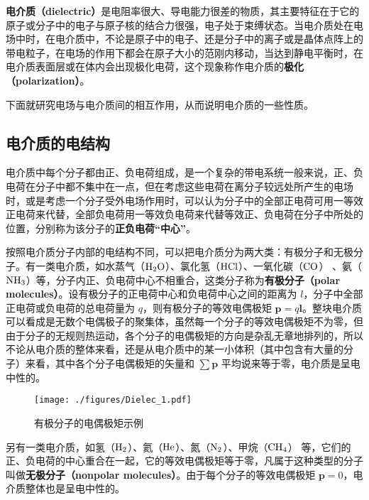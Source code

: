 
\begin{issues}
\end{issues}


\textbf{电介质（dielectric）}是电阻率很大、导电能力很差的物质，其主要特征在于它的原子或分子中的电子与原子核的结合力很强，电子处于束缚状态。当电介质处在电场中时，在电介质中，不论是原子中的电子、还是分子中的离子或是晶体点阵上的带电粒子，在电场的作用下都会在原子大小的范刚内移动，当达到静电平衡时，在电介质表面层或在体内会出现极化电荷，这个现象称作电介质的\textbf{极化（polarization）}。

下面就研究电场与电介质间的相互作用，从而说明电介质的一些性质。

\subsection{电介质的电结构}

电介质中每个分子都由正、负电荷组成，是一个复杂的带电系统一般来说，正、负电荷在分子中都不集中在一点，但在考虑这些电荷在离分子较远处所产生的电场时，或是考虑一个分子受外电场作用时，可以认为分子中的全部正电荷可用一等效正电荷来代替，全部负电荷用一等效负电荷来代替等效正、负电荷在分子中所处的位置，分别称为该分子的\textbf{正负电荷“中心”}。

按照电介质分子内部的电结构不同，可以把电介质分为两大类：有极分子和无极分子。有一类电介质，如水蒸气（$\rm H_2O$）、氯化氢（$\rm HCl$）、一氧化碳（$\rm CO$） 、氨（$\rm NH_3$）等，分子内正、负电荷中心不相重合，这类分子称为\textbf{有极分子（polar molecules）}。设有极分子的正电荷中心和负电荷中心之间的距离为 $l$，分子中全部正电荷或负电荷的总电荷量为 $q$，则有极分子的等效电偶极矩 $\mathbf p=q\mathbf l$。整块电介质可以看成是无数个电偶极子的聚集体，虽然每一个分子的等效电偶极矩不为零，但由于分子的无规则热运动，各个分子的电偶极矩的方向是杂乱无章地排列的，所以不论从电介质的整体来看，还是从电介质中的某一小体积（其中包含有大量的分子）来看，其中各个分子电偶极矩的矢量和 $\sum \mathbf p$ 平均说来等于零，电介质是呈电中性的。
\begin{figure}[ht]
\centering
\texttt{[image: ./figures/Dielec\_1.pdf]}
\caption{有极分子的电偶极矩示例} \label{Dielec_fig1}
\end{figure}
另有一类电介质，如氢（$\rm H_2$）、氦（$\rm He$）、氮（$\rm N_2$）、甲烷（$\rm CH_4$） 等，它们的正、负电荷的中心重合在一起，它的等效电偶极矩等于零，凡属于这种类型的分子叫做\textbf{无极分子（nonpolar molecules）}。由于每个分子的等效电偶极矩 $\mathbf p=0$，电介质整体也是呈电中性的。

